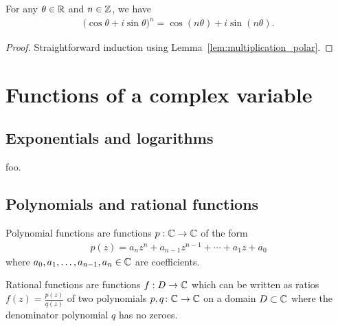 \begin{lemma}
  \label{lem:de_moivre}
  For any $\theta \in \mathbb{R}$ and $n \in \mathbb{Z}$, we have
  \begin{align*}
    \big( \cos \theta + i \sin \theta \big)^n = \cos(n \theta) + i \sin(n \theta) .
  \end{align*}
\end{lemma}
\begin{proof}
  Straightforward induction using Lemma~\ref{lem:multiplication_polar}.
\end{proof}




\section{Functions of a complex variable}


\subsection{Exponentials and logarithms}

\begin{definition}
  \label{def:complex_exp}

  foo.
\end{definition}


\subsection{Polynomials and rational functions}

\begin{definition}[Polynomial]
  \label{def:polynomial}
  Polynomial functions are functions $p : \mathbb{C} \to \mathbb{C}$ of the form
  \begin{align*}
    p(z) = a_n z^n + a_{n-1} z^{n-1} + \cdots + a_1 z + a_0
  \end{align*}
  where $a_0,a_1,\ldots,a_{n-1},a_n \in \mathbb{C}$ are coefficients.
\end{definition}

\begin{definition}
  \label{def:rational_function}
  Rational functions are functions $f : D \to \mathbb{C}$ which can be written as
  ratios $f(z) = \frac{p(z)}{q(z)}$ of two polynomials
  $p, q \colon \mathbb{C} \to \mathbb{C}$ on a domain $D \subset \mathbb{C}$
  where the denominator polynomial $q$ has no zeroes.
\end{definition}
